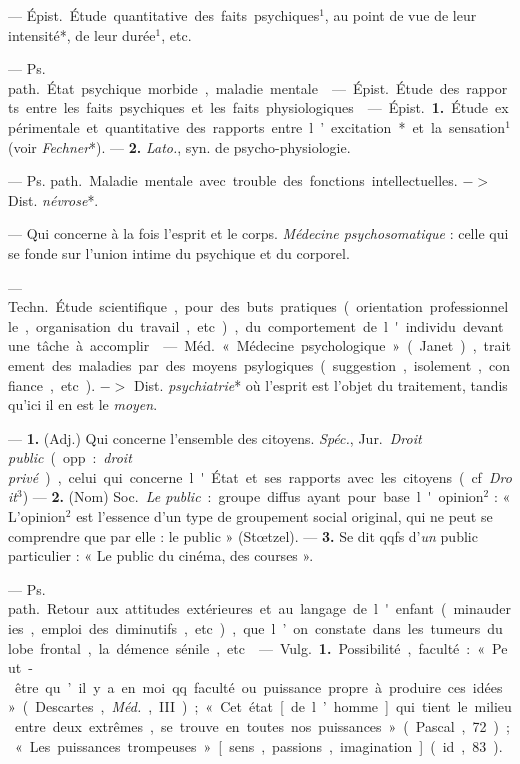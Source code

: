\begin{itemize}[leftmargin=1cm, label=, itemsep=1pt]
 — \si{Épist.} Étude quantitative des faits psychiques$^1$,
au point de vue de leur intensité*, de leur durée$^1$, etc.

 — \si{Ps. path.} État psychique morbide, maladie mentale.

 — \si{Épist.} Étude
des rapports entre les faits psychiques et les faits physiologiques.

 — \si{Épist.} {\bf 1.} Étude expérimentale et
quantitative des rapports entre l’excitation* et la sensation$^1$ (voir {\it
Fechner}*). — {\bf 2.}
{\it Lato.}, syn. de psycho-physiologie.

 — \si{Ps. path.} Maladie mentale
avec trouble des fonctions intellectuelles. $->$ Dist. {\it névrose}*.

 — Qui concerne à la fois l'esprit et le corps. {\it
Médecine psychosomatique} : celle qui se fonde sur l’union intime du
psychique et du corporel.

 — \si{Techn.} Étude scientifique, pour des buts
pratiques (orientation professionnelle, organisation du travail, etc.), du
comportement de l'individu devant une tâche à accomplir.

 — \si{Méd.} « Médecine psychologique » (Janet),
traitement des maladies par des moyens psylogiques (suggestion, isolement,
confiance, etc). $->$ Dist. {\it psychiatrie}* où l'esprit est l’objet du
traitement, tandis qu'ici il en est le {\it moyen}.

 — {\bf 1.} (Adj.) Qui concerne l’ensemble des citoyens.
{\it Spéc.}, \si{Jur.} {\it Droit public} (opp. : {\it droit privé}), celui
qui concerne l'État et ses rapports avec les citoyens (cf. {\it Droit}$^3$)
— {\bf 2.} (Nom) \si{Soc.} {\it Le public} : groupe diffus ayant pour base
l'opinion$^2$ : « L'opinion$^2$ est l'essence d’un type de groupement social
original, qui ne peut se comprendre que par elle : le public » (Stœtzel). —
{\bf 3.} Se dit qqfs d'{\it un} public particulier : « Le public du cinéma,
des courses ».

 — \si{Ps. path.} Retour aux attitudes extérieures et au
langage de l'enfant (minauderies, emploi des diminutifs, etc.), que l’on
constate dans les tumeurs du lobe frontal, la démence sénile, etc.

 — \si{Vulg.} {\bf 1.} Possibilité,
faculté : « Peut-être qu’il y a en moi
qq. faculté ou puissance propre à produire ces idées » (Descartes,
{\it Méd.}, III) ; « Cet état [de l’homme] qui tient le milieu entre deux
extrêmes, se trouve en toutes nos puissances » (Pascal, 72) ; « Les
puissances trompeuses » [sens, passions, imagination] (id., 83).


\end{itemize}
